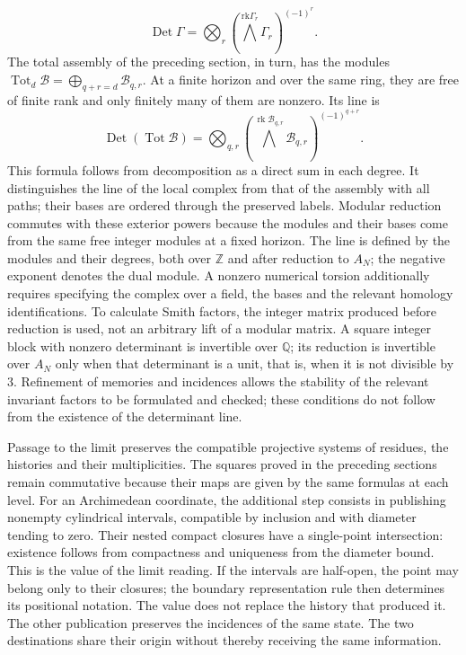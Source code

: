 \[
\operatorname{Det}\Gamma=
\bigotimes_r\left(\bigwedge^{\mathrm{rk}\Gamma_r}\Gamma_r\right)^{(-1)^r}.
\]
The total assembly of the preceding section, in turn, has the modules \(\operatorname{Tot}_d\mathcal B=\bigoplus_{q+r=d}\mathcal B_{q,r}\). At a finite horizon and over the same ring, they are free of finite rank and only finitely many of them are nonzero. Its line is
\[
\operatorname{Det}(\operatorname{Tot}\mathcal B)=
\bigotimes_{q,r}
\left(\bigwedge^{\operatorname{rk}\mathcal B_{q,r}}
\mathcal B_{q,r}\right)^{(-1)^{q+r}}.
\]
This formula follows from decomposition as a direct sum in each degree. It distinguishes the line of the local complex from that of the assembly with all paths; their bases are ordered through the preserved labels. Modular reduction commutes with these exterior powers because the modules and their bases come from the same free integer modules at a fixed horizon.
The line is defined by the modules and their degrees, both over \(\mathbb Z\) and after reduction to \(A_N\); the negative exponent denotes the dual module. A nonzero numerical torsion additionally requires specifying the complex over a field, the bases and the relevant homology identifications. To calculate Smith factors, the integer matrix produced before reduction is used, not an arbitrary lift of a modular matrix. A square integer block with nonzero determinant is invertible over \(\mathbb Q\); its reduction is invertible over \(A_N\) only when that determinant is a unit, that is, when it is not divisible by \(3\). Refinement of memories and incidences allows the stability of the relevant invariant factors to be formulated and checked; these conditions do not follow from the existence of the determinant line.

Passage to the limit preserves the compatible projective systems of residues, the histories and their multiplicities. The squares proved in the preceding sections remain commutative because their maps are given by the same formulas at each level. For an Archimedean coordinate, the additional step consists in publishing nonempty cylindrical intervals, compatible by inclusion and with diameter tending to zero. Their nested compact closures have a single-point intersection: existence follows from compactness and uniqueness from the diameter bound. This is the value of the limit reading. If the intervals are half-open, the point may belong only to their closures; the boundary representation rule then determines its positional notation. The value does not replace the history that produced it. The other publication preserves the incidences of the same state. The two destinations share their origin without thereby receiving the same information.

